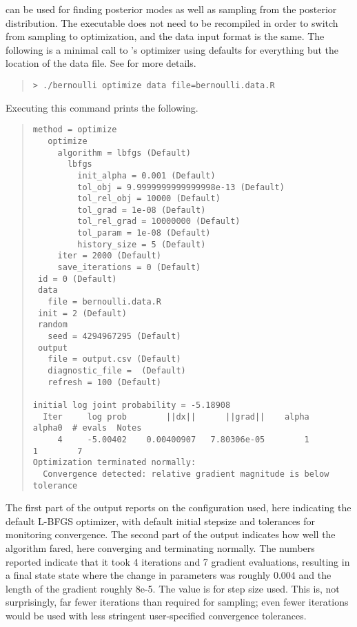 \CmdStan can be used for finding posterior modes as well as sampling
from the posterior distribution. The executable does not need to be
recompiled in order to switch from sampling to optimization, and the
data input format is the same. The following is a minimal call to
\Stan's optimizer using defaults for everything but the location of the
data file. See  for more
details.
%
\begin{quote}
\begin{Verbatim}[fontshape=sl]
> ./bernoulli optimize data file=bernoulli.data.R
\end{Verbatim}
\end{quote}
%
Executing this command prints the following.
%
\begin{quote}
\begin{Verbatim}[fontsize=\footnotesize]
 method = optimize
   optimize
     algorithm = lbfgs (Default)
       lbfgs
         init_alpha = 0.001 (Default)
         tol_obj = 9.9999999999999998e-13 (Default)
         tol_rel_obj = 10000 (Default)
         tol_grad = 1e-08 (Default)
         tol_rel_grad = 10000000 (Default)
         tol_param = 1e-08 (Default)
         history_size = 5 (Default)
     iter = 2000 (Default)
     save_iterations = 0 (Default)
 id = 0 (Default)
 data
   file = bernoulli.data.R
 init = 2 (Default)
 random
   seed = 4294967295 (Default)
 output
   file = output.csv (Default)
   diagnostic_file =  (Default)
   refresh = 100 (Default)

initial log joint probability = -5.18908
  Iter     log prob        ||dx||      ||grad||    alpha   alpha0  # evals  Notes
     4     -5.00402    0.00400907   7.80306e-05        1        1        7
Optimization terminated normally:
  Convergence detected: relative gradient magnitude is below tolerance
\end{Verbatim}
\end{quote}
%
The first part of the output reports on the configuration used, here
indicating the default L-BFGS optimizer, with default initial stepsize
and tolerances for monitoring convergence.  The second part of the
output indicates how well the algorithm fared, here converging and
terminating normally.  The numbers reported indicate that it took 4
iterations and 7 gradient evaluations, resulting in a final state
state where the change in parameters was roughly 0.004 and the length
of the gradient roughly 8e-5.  The  value is for step
size used.  This is, not surprisingly, far fewer iterations than
required for sampling; even fewer iterations would be used with less
stringent user-specified convergence tolerances.


